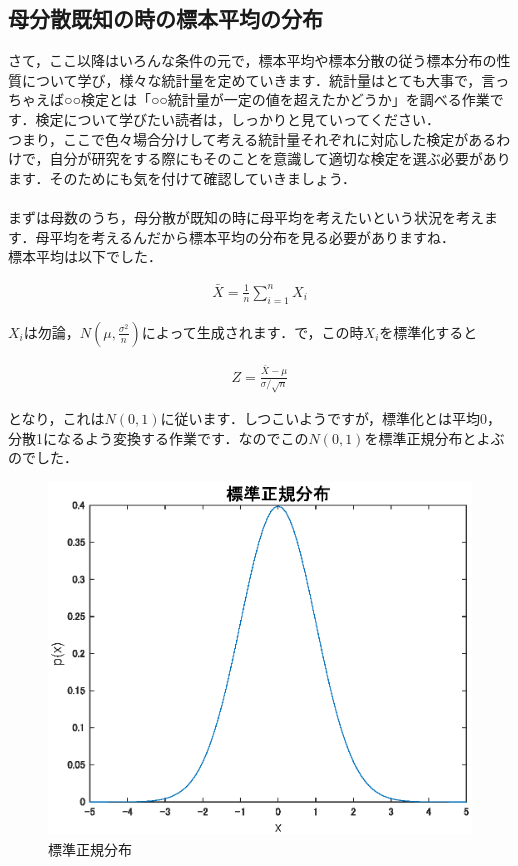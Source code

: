 \documentclass[11pt,a4paper]{ujreport} 	%
\begin{document}
\subsection{母分散既知の時の標本平均の分布}
さて，ここ以降はいろんな条件の元で，標本平均や標本分散の従う標本分布の性質について学び，様々な統計量を定めていきます．統計量はとても大事で，言っちゃえば○○検定とは「○○統計量が一定の値を超えたかどうか」を調べる作業です．検定について学びたい読者は，しっかりと見ていってください．\\

つまり，ここで色々場合分けして考える統計量それぞれに対応した検定があるわけで，自分が研究をする際にもそのことを意識して適切な検定を選ぶ必要があります．そのためにも気を付けて確認していきましょう．\\
\\

まずは母数のうち，母分散が既知の時に母平均を考えたいという状況を考えます．母平均を考えるんだから標本平均の分布を見る必要がありますね．\\

標本平均は以下でした．

\begin{align}
  \bar{X} = \frac{1}{n}\sum_{i=1}^n X_i
\end{align}

$X_i$は勿論，$N(\mu, \frac{\sigma^2}{n})$によって生成されます．で，この時$X_i$を標準化すると

\begin{align}
  Z = \frac{\bar{X}-\mu}{\sigma/\sqrt{n}}
  \label{eq:z}
\end{align}

となり，これは$N(0,1)$に従います．しつこいようですが，標準化とは平均0，分散1になるよう変換する作業です．なのでこの$N(0,1)$を標準正規分布とよぶのでした．\\

\begin{figure}[H]
  \centering
  \includegraphics[width=15cm]{../figures/std-normal.eps}
  \caption{標準正規分布}
\end{figure}
\end{document}
